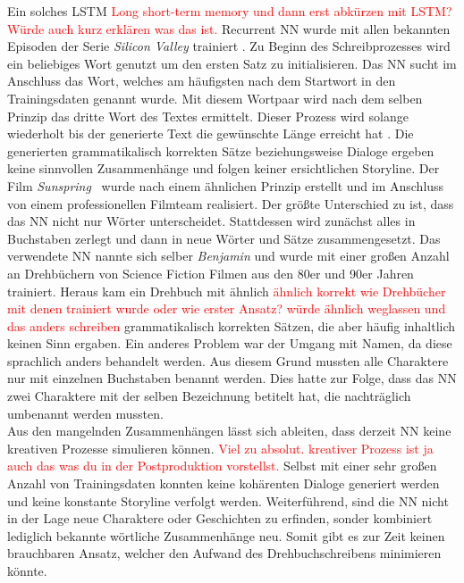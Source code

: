 \documentclass[times, 11pt,twocolumn]{article}
\begin{document}
 \label{sec:SOTAVorverarbeitung}
Ein solches LSTM \textcolor{red}{Long short-term memory und dann erst abkürzen mit LSTM? Würde auch kurz erklären was das ist.} Recurrent NN wurde mit allen bekannten Episoden der Serie \textit{Silicon Valley} trainiert \cite{DrehbuchSV}. Zu Beginn des Schreibprozesses wird ein beliebiges Wort genutzt um den ersten Satz zu initialisieren. Das NN sucht im Anschluss das Wort, welches am häufigsten nach dem Startwort in den Trainingsdaten genannt wurde. Mit diesem Wortpaar wird nach dem selben Prinzip das dritte Wort des Textes ermittelt. Dieser Prozess wird solange wiederholt bis der generierte Text die gewünschte Länge erreicht hat \cite{DrehbuchWrite}. Die generierten grammatikalisch korrekten Sätze beziehungsweise Dialoge ergeben keine sinnvollen Zusammenhänge und folgen keiner ersichtlichen Storyline. Der Film \textit{Sunspring}~\cite{DrehbuchMovie} wurde nach einem ähnlichen Prinzip erstellt und im Anschluss von einem professionellen Filmteam realisiert. Der größte Unterschied zu \cite{DrehbuchSV} ist, dass das NN nicht nur Wörter unterscheidet. Stattdessen wird zunächst alles in Buchstaben zerlegt und dann in neue Wörter und Sätze zusammengesetzt. Das verwendete NN nannte sich selber \textit{Benjamin} und wurde mit einer großen Anzahl an Drehbüchern von Science Fiction Filmen aus den 80er und 90er Jahren trainiert. Heraus kam ein Drehbuch mit ähnlich \textcolor{red}{ähnlich korrekt wie Drehbücher mit denen trainiert wurde oder wie erster Ansatz? würde ähnlich weglassen und das anders schreiben} grammatikalisch korrekten Sätzen, die aber häufig inhaltlich keinen Sinn ergaben. Ein anderes Problem war der Umgang mit Namen, da diese sprachlich anders behandelt werden. Aus diesem Grund mussten alle Charaktere nur mit einzelnen Buchstaben benannt werden. Dies hatte zur Folge, dass das NN zwei Charaktere mit der selben Bezeichnung betitelt hat, die nachträglich umbenannt werden mussten.\\

Aus den mangelnden Zusammenhängen lässt sich ableiten, dass derzeit NN keine kreativen Prozesse simulieren können. \textcolor{red}{Viel zu absolut. kreativer Prozess ist ja auch das was du in der Postproduktion vorstellst.} Selbst mit einer sehr großen Anzahl von Trainingsdaten konnten keine kohärenten Dialoge generiert werden und keine konstante Storyline verfolgt werden. Weiterführend, sind die NN nicht in der Lage neue Charaktere oder Geschichten zu erfinden, sonder kombiniert lediglich bekannte wörtliche Zusammenhänge neu. Somit gibt es zur Zeit keinen brauchbaren Ansatz, welcher den Aufwand des Drehbuchschreibens minimieren könnte. 
\end{document}
